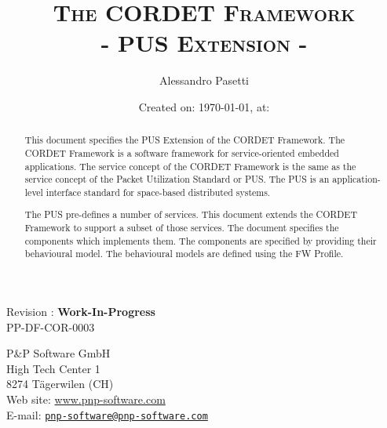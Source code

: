 \documentclass[a4paper,10pt]{article}
\title{\textsc{The CORDET Framework} \\ \textsc{- PUS Extension -}}
\author{Alessandro Pasetti }
\date{Created on: \today{}, at: \currenttime{}}
\newcommand{\docIssue}{: \textbf{Work-In-Progress}}						%
\newcommand{\docRefNumber}{PP-DF-COR-0003}		%
\begin{document}
\maketitle

\begin{center}
Revision \docIssue{}\\
\docRefNumber{}
\end{center}

\vspace{1cm}

\begin{center}
P\&P Software GmbH \\
High Tech Center 1 \\
8274 T\"{a}gerwilen (CH)\\
\vspace{2mm}
Web site: \url{www.pnp-software.com}\\
E-mail: \href{mailto:pnp-software@pnp-software.com}{\nolinkurl{pnp-software@pnp-software.com}} 
\end{center}

\vspace{0.5cm}

\begin{table}[ht]
\begin{center}
\begin{tabular}{p{11.7cm}}
\\
\hline
\end{tabular}
\end{center}
\end{table}
\begin{abstract}
This document specifies the PUS Extension of the CORDET Framework. The CORDET Framework is a software framework for service-oriented embedded applications. The service concept of the CORDET Framework is the same as the service concept of the Packet Utilization Standard or PUS. The PUS is an application-level interface standard for space-based distributed systems.

The PUS pre-defines a number of services. This document extends the CORDET Framework to support a subset of those services. The document specifies the components which implements them. The components are specified by providing their behavioural model. The behavioural models are defined using the FW Profile.

\end{abstract}
\begin{table}[ht]
\begin{center}
\begin{tabular}{p{11.7cm}}
\\
\hline
\end{tabular}
\end{center}
\end{table}
\end{document}
